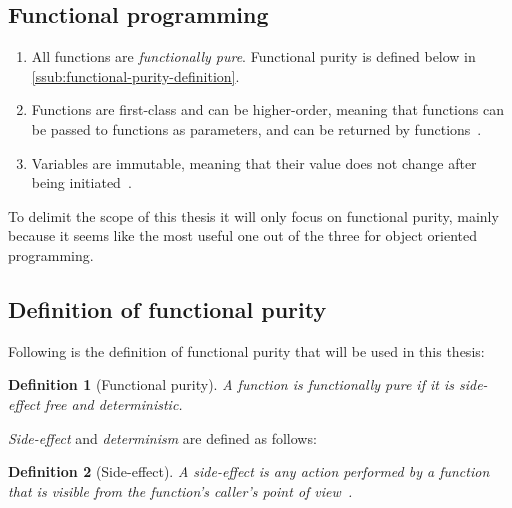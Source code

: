 \documentclass[a4paper,12pt]{article}
\newtheorem{definition}{Definition} %
\begin{document}
\subsection{Functional programming} \label{sub:functional-programming}

\begin{enumerate}
  \item All functions are \emph{functionally pure}. Functional purity is defined below in \autoref{ssub:functional-purity-definition}.
  \item Functions are first-class and can be higher-order, meaning that functions can be passed to functions as parameters, and can be returned by functions~\cite{jonas-walter}. %
  \item Variables are immutable, meaning that their value does not change after being initiated~\cite{jonas-walter}. %
\end{enumerate}

To delimit the scope of this thesis it will only focus on functional purity, mainly because it seems like the most useful one out of the three for object oriented programming.%

\subsection{Definition of functional purity} \label{ssub:functional-purity-definition}

Following is the definition of functional purity that will be used in this thesis:

\begin{definition}[Functional purity] \label{def:functional-purity}
  A function is functionally pure if it is \textit{side-effect} free and \textit{deterministic}.
\end{definition}

\textit{Side-effect} and \textit{determinism} are defined as follows:

\begin{definition}[Side-effect] \label{def:side-effect}
  A side-effect is any action performed by a function that is visible from the function's caller's point of view~\cite{purity-in-javascript}.
\end{definition}
\end{document}
